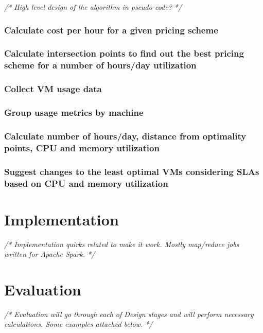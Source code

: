 \documentclass[]{final_report}
\begin{document}
\emph{/* High level design of the algorithm in pseudo-code? */}

\subsection{Calculate cost per hour for a given pricing scheme}
\subsection{Calculate intersection points to find out the best pricing scheme for a number of hours/day utilization}
\subsection{Collect VM usage data}
\subsection{Group usage metrics by machine}
\subsection{Calculate number of hours/day, distance from optimality points, CPU and memory utilization}
\subsection{Suggest changes to the least optimal VMs considering SLAs based on CPU and memory utilization}


\chapter{Implementation}

\emph{/* Implementation quirks related to make it work. Mostly map/reduce jobs written for Apache Spark. */}


\chapter{Evaluation}

\emph{/* Evaluation will go through each of Design stages and will perform necessary calculations. Some examples attached below. */}
\end{document}
